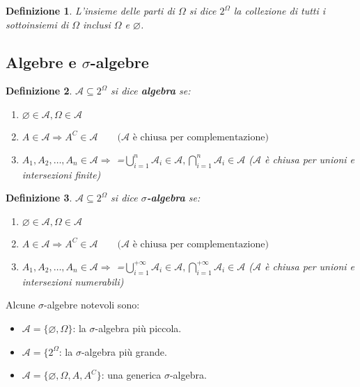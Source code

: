 \documentclass[a4paper,12pt]{article}
\theoremstyle{break}
\newtheorem{definition}{Definizione}[section]
\let\emptyset\varnothing
\numberwithin{equation}{section}
\begin{document}
\begin{definition}
L'insieme delle parti di $\Omega$ si dice $2^{\Omega}$ la collezione di tutti i sottoinsiemi di $\Omega$ inclusi $\Omega$ e $\emptyset$.
\end{definition}
\subsection{Algebre e $\sigma$-algebre}
\begin{definition}
$\mathcal{A} \subseteq 2^{\Omega}$ si dice \textbf{algebra} se:
\begin{enumerate}
\item $\emptyset \in \mathcal{A}, \Omega \in \mathcal{A}$
\item $A \in \mathcal{A} \Longrightarrow A^C \in \mathcal{A} \qquad \mbox{(}\mathcal{A} \mbox{ è chiusa per complementazione)}$
\item $A_1, A_2, \ldots, A_n \in \mathcal{A} \Longrightarrow$ {\everymath ={\displaystyle}$\bigcup_{i=1}^n \mathcal{A}_i \in \mathcal{A}, \bigcap_{i=1}^n \mathcal{A}_i \in \mathcal{A}$} ($\mathcal{A}$ è chiusa per unioni e intersezioni finite)
\end{enumerate}
\end{definition}
\begin{definition}
$\mathcal{A} \subseteq 2^{\Omega}$ si dice \textbf{$\sigma$-algebra} se:
\begin{enumerate}
\item $\emptyset \in \mathcal{A}, \Omega \in \mathcal{A}$
\item $A \in \mathcal{A} \Longrightarrow A^C \in \mathcal{A} \qquad \mbox{(}\mathcal{A} \mbox{ è chiusa per complementazione)}$
\item $A_1, A_2, \ldots, A_n \in \mathcal{A} \Longrightarrow$ {\everymath ={\displaystyle}$\bigcup_{i=1}^{+\infty} \mathcal{A}_i \in \mathcal{A}, \bigcap_{i=1}^{+\infty} \mathcal{A}_i \in \mathcal{A}$} ($\mathcal{A}$ è chiusa per unioni e intersezioni numerabili)
\end{enumerate}
\end{definition}
Alcune $\sigma$-algebre notevoli sono:
\begin{itemize}
\item $\mathcal{A} = \{\emptyset, \Omega\}$: la $\sigma$-algebra più piccola.
\item $\mathcal{A} = \{2^{\Omega}$: la $\sigma$-algebra più grande.
\item $\mathcal{A} = \{\emptyset, \Omega, A, A^C \}$: una generica $\sigma$-algebra.
\end{itemize}
\end{document}
